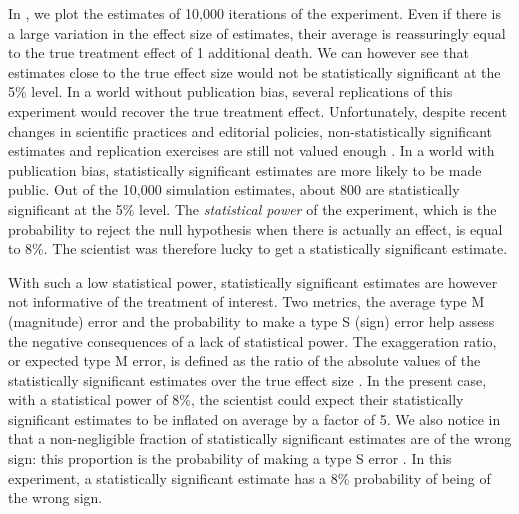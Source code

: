 \documentclass[12pt]{article}
\begin{document}
    In , we plot the estimates of 10,000 iterations of the experiment. Even if there is a large variation in the effect size of estimates, their average is reassuringly equal to the true treatment effect of 1 additional death. We can however see that estimates close to the true effect size would not be statistically significant at the 5\% level. In a world without publication bias, several replications of this experiment would recover the true treatment effect. Unfortunately, despite recent changes in scientific practices and editorial policies, non-statistically significant estimates and replication exercises are still not valued enough \citep{brodeur_methods_2020}. In a world with publication bias, statistically significant estimates are more likely to be made public. Out of the 10,000 simulation estimates, about 800 are statistically significant at the 5\% level. The \textit{statistical power} of the experiment, which is the probability to reject the null hypothesis when there is actually an effect, is equal to 8\%. The scientist was therefore lucky to get a statistically significant estimate.
    
    With such a low statistical power, statistically significant estimates are however not informative of the treatment of interest. Two metrics, the average type M (magnitude) error and the probability to make a type S (sign) error help assess the negative consequences of a lack of statistical power. The exaggeration ratio, or expected type M error, is defined as the ratio of the absolute values of the statistically significant estimates over the true effect size \citep{gelman_beyond_2014}. In the present case, with a statistical power of 8\%, the scientist could expect their statistically significant estimates to be inflated on average by a factor of 5. We also notice in  that a non-negligible fraction of statistically significant estimates are of the wrong sign: this proportion is the probability of making a type S error \citep{gelman_beyond_2014}. In this experiment, a statistically significant estimate has a 8\% probability of being of the wrong sign. 
    
\end{document}

